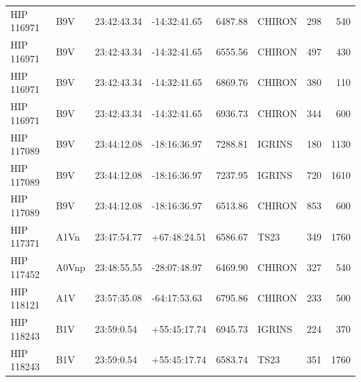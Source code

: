 \documentclass{emulateapj}
\begin{document}
\begin{longtable*}{|l|lllrlrr|}
  HIP 116971 &            B9V &    23:42:43.34 &   -14:32:41.65 &  6487.88 &     CHIRON &      298 &     540 \\
  HIP 116971 &            B9V &    23:42:43.34 &   -14:32:41.65 &  6555.56 &     CHIRON &      497 &     430 \\
  HIP 116971 &            B9V &    23:42:43.34 &   -14:32:41.65 &  6869.76 &     CHIRON &      380 &     110 \\
  HIP 116971 &            B9V &    23:42:43.34 &   -14:32:41.65 &  6936.73 &     CHIRON &      344 &     600 \\
  HIP 117089 &            B9V &    23:44:12.08 &   -18:16:36.97 &  7288.81 &     IGRINS &      180 &    1130 \\
  HIP 117089 &            B9V &    23:44:12.08 &   -18:16:36.97 &  7237.95 &     IGRINS &      720 &    1610 \\
  HIP 117089 &            B9V &    23:44:12.08 &   -18:16:36.97 &  6513.86 &     CHIRON &      853 &     600 \\
  HIP 117371 &           A1Vn &    23:47:54.77 &   +67:48:24.51 &  6586.67 &       TS23 &      349 &    1760 \\
  HIP 117452 &          A0Vnp &    23:48:55.55 &   -28:07:48.97 &  6469.90 &     CHIRON &      327 &     540 \\
  HIP 118121 &            A1V &    23:57:35.08 &   -64:17:53.63 &  6795.86 &     CHIRON &      233 &     500 \\
  HIP 118243 &            B1V &     23:59:0.54 &   +55:45:17.74 &  6945.73 &     IGRINS &      224 &     370 \\
  HIP 118243 &            B1V &     23:59:0.54 &   +55:45:17.74 &  6583.74 &       TS23 &      351 &    1760
\label{tab:observations}
\end{longtable*}
\end{document}
